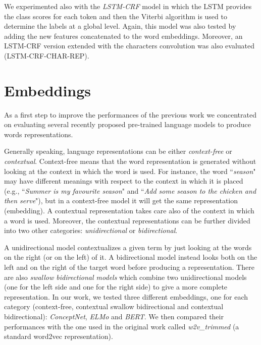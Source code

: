 \documentclass[11pt,a4paper]{article}
\begin{document}
We experimented also with the \textit{LSTM-CRF} model \cite{
yao2014recurrent, DBLP:journals/corr/HuangXY15} in 
which the LSTM provides the class scores for each 
token and then the Viterbi algorithm is used to 
determine the labels at a global level.  Again, this 
model was also tested by adding the new features 
concatenated to the word embeddings. Moreover, an 
LSTM-CRF version extended with the characters 
convolution was also evaluated (LSTM-CRF-CHAR-REP).

\section{Embeddings}

As a first step to improve the performances of the previous work we concentrated on evaluating several recently proposed pre-trained language models to produce words representations.

Generally speaking, language representations can be either \textit{context-free} or \textit{contextual}. 
Context-free means that the word representation is generated without looking at the context in which the word is used. For instance, the word ``\textit{season}" may have different meanings with respect to the context in which it is placed (e.g., ``\textit{Summer is my favourite season}" and ``\textit{Add some season to the chicken and then serve}"), but in a context-free model it will get the same representation (embedding). A contextual representation takes care also of the context in which a word is used.
Moreover, the contextual representations can be further divided into two other categories: \textit{unidirectional} or \textit{bidirectional}. 

A unidirectional model contextualizes a given term by just looking at the words on the right (or on the left) of it.  A bidirectional model instead looks both on the left and on the right of the target word before producing a representation. There are also \textit{swallow bidirectional models} which combine two unidirectional models (one for the left side and one for the right side) to give a more complete representation. In our work, we tested three different embeddings, one for each category (context-free, contextual swallow bidirectional and contextual bidirectional): \textit{ConceptNet}, \textit{ELMo} and \textit{BERT}. We then compared their performances with the one used in the original work called \textit{w2v\_trimmed} (a standard word2vec representation).
\end{document}
